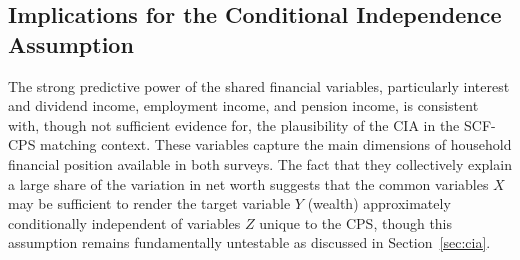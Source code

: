 \subsection{Implications for the Conditional Independence Assumption}

The strong predictive power of the shared financial variables, particularly interest and dividend income, employment income, and pension income, is consistent with, though not sufficient evidence for, the plausibility of the CIA in the SCF-CPS matching context. These variables capture the main dimensions of household financial position available in both surveys. The fact that they collectively explain a large share of the variation in net worth suggests that the common variables $X$ may be sufficient to render the target variable $Y$ (wealth) approximately conditionally independent of variables $Z$ unique to the CPS, though this assumption remains fundamentally untestable as discussed in Section~\ref{sec:cia}.
